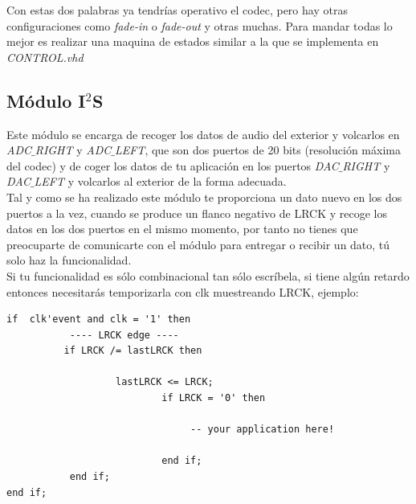 	Con estas dos palabras ya tendrías operativo el codec, pero hay otras configuraciones como \emph{fade-in} o \emph{fade-out} y otras muchas. Para mandar todas lo mejor es realizar una maquina de estados similar a la que se implementa en \emph{CONTROL.vhd}

	
	\subsection{Módulo I$^2$S}
	Este módulo se encarga de recoger los datos de audio del exterior y volcarlos en \emph{ADC$\_$RIGHT} y \emph{ADC$\_$LEFT}, que son dos puertos de 20 bits (resolución máxima del codec)
	y de coger los datos de tu aplicación en los puertos  \emph{DAC$\_$RIGHT} y \emph{DAC$\_$LEFT} y volcarlos al exterior de la forma adecuada.\\
	
	Tal y como se ha realizado este módulo te proporciona un dato nuevo en los dos puertos a la vez, cuando se produce un flanco negativo de LRCK y recoge los datos en los dos puertos en el mismo momento, por tanto no tienes que preocuparte de comunicarte con el módulo para entregar o recibir un dato, tú solo haz la funcionalidad.\\
	
	Si tu funcionalidad es sólo combinacional tan sólo escríbela, si tiene algún retardo entonces necesitarás temporizarla con clk muestreando LRCK, ejemplo:
	\begin{verbatim}
if  clk'event and clk = '1' then			
           ---- LRCK edge ----
          if LRCK /= lastLRCK then
					
                   lastLRCK <= LRCK;			
                           if LRCK = '0' then
                           
                                -- your application here!	
                                
                           end if;
           end if;
end if;
\end{verbatim}

	
 \newpage
